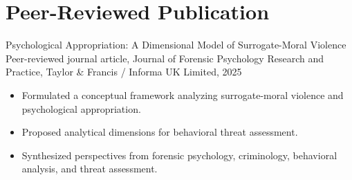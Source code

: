 \section{Peer-Reviewed Publication}
\cvpublication
  {Psychological Appropriation: A Dimensional Model of Surrogate-Moral Violence}
  {Peer-reviewed journal article, Journal of Forensic Psychology Research and Practice, Taylor \& Francis / Informa UK Limited, 2025}
  {}
  {
    \begin{itemize}
      \item Formulated a conceptual framework analyzing surrogate-moral violence and psychological appropriation.
      \item Proposed analytical dimensions for behavioral threat assessment.
      \item Synthesized perspectives from forensic psychology, criminology, behavioral analysis, and threat assessment.
    \end{itemize}
  }
